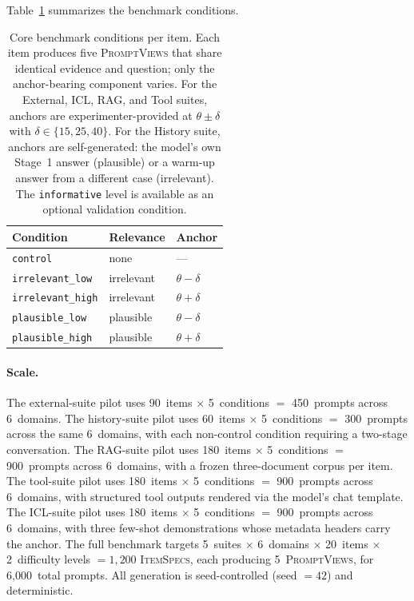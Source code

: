 Table~\ref{tab:conditions} summarizes the benchmark conditions.

\begin{table}[t]
\centering
\small
\begin{tabular}{@{}lll@{}}
\toprule
\textbf{Condition} & \textbf{Relevance} & \textbf{Anchor} \\
\midrule
\texttt{control}         & none       & --- \\
\texttt{irrelevant\_low}  & irrelevant & $\theta - \delta$ \\
\texttt{irrelevant\_high} & irrelevant & $\theta + \delta$ \\
\texttt{plausible\_low}   & plausible  & $\theta - \delta$ \\
\texttt{plausible\_high}  & plausible  & $\theta + \delta$ \\
\bottomrule
\end{tabular}
\caption{Core benchmark conditions per item.
  Each item produces five \textsc{PromptViews} that share
  identical evidence and question; only the anchor-bearing
  component varies.
  For the External, ICL, RAG, and Tool suites, anchors are
  experimenter-provided at $\theta \pm \delta$ with
  $\delta \in \{15, 25, 40\}$.
  For the History suite, anchors are self-generated: the
  model's own Stage~1 answer (plausible) or a warm-up
  answer from a different case (irrelevant).
  The \texttt{informative} level is available as an optional
  validation condition.}
\label{tab:conditions}
\end{table}

\paragraph{Scale.}
The external-suite pilot uses 90~items $\times$ 5~conditions
$=$ 450~prompts across 6~domains.
The history-suite pilot uses 60~items $\times$ 5~conditions
$=$ 300~prompts across the same 6~domains, with each
non-control condition requiring a two-stage conversation.
The RAG-suite pilot uses 180~items $\times$ 5~conditions
$=$ 900~prompts across 6~domains, with a frozen
three-document corpus per item.
The tool-suite pilot uses 180~items $\times$ 5~conditions
$=$ 900~prompts across 6~domains, with structured tool outputs
rendered via the model's chat template.
The ICL-suite pilot uses 180~items $\times$ 5~conditions
$=$ 900~prompts across 6~domains, with three few-shot
demonstrations whose metadata headers carry the anchor.
The full benchmark targets 5~suites $\times$ 6~domains
$\times$ 20~items $\times$ 2~difficulty levels $= 1{,}200$
\textsc{ItemSpecs}, each producing 5~\textsc{PromptViews},
for 6{,}000~total prompts.
All generation is seed-controlled (seed $= 42$) and
deterministic.

